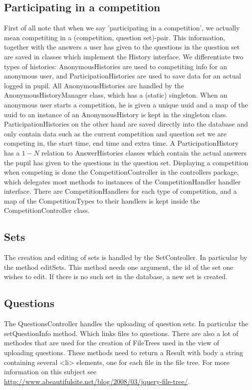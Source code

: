 \documentclass[11pt,a4paper]{article}
\begin{document}
\subsection{Participating in a competition}
First of all note that when we say 'participating in a competition', we actually mean competiting in a (competition, question set)-pair. This information, together with the answers a user has given to the questions in the question set are saved in classes which implement the History interface. We differentiate two types of histories: AnonymousHistories are used to competiting info for an anonymous user, and ParticipationHistories are used to save data for an actual logged in pupil. All AnonymousHistories are handled by the AnonymousHistoryManager class, which has a (static) singleton. When an anonymous user starts a competition, he is given a unique uuid and a map of the uuid to an instance of an AnonymousHistory is kept in the singleton class.
ParticipationHistories on the other hand are saved directly into the database and only contain data such as the current competition and question set we are competing in, the start time, end time and extra time. A ParticipationHistory has a $1-N$ relation to AnswerHistories classes which contain the actual answers the pupil has given to the questions in the question set.
Displaying a competition when competing is done the CompetitionController in the controllers package, which delegates most methods to instances of the CompetitionHandler handler interface. There are CompetitionHandlers for each type of competition, and a map of the CompetitionTypes to their handlers is kept inside the CompetitionController class.
\subsection{Sets}
The creation and editing of sets is handled by the SetController. In particular by the method editSets. This method needs one argument, the id of the set one wishes to edit. If there is no such set in the database, a new set is created.

\subsection{Questions}
The QuestionsController handles the uploading of question sets. In particular the setQuestionInfo method. Which links files to questions. There are also a lot of methodes that are used for the creation of FileTrees used in the view of uploading questions. These methods need to return a Result with body a string containing several <li> elements, one for each file in the file tree. For more information on this subject see \url{http://www.abeautifulsite.net/blog/2008/03/jquery-file-tree/}.
\end{document}
